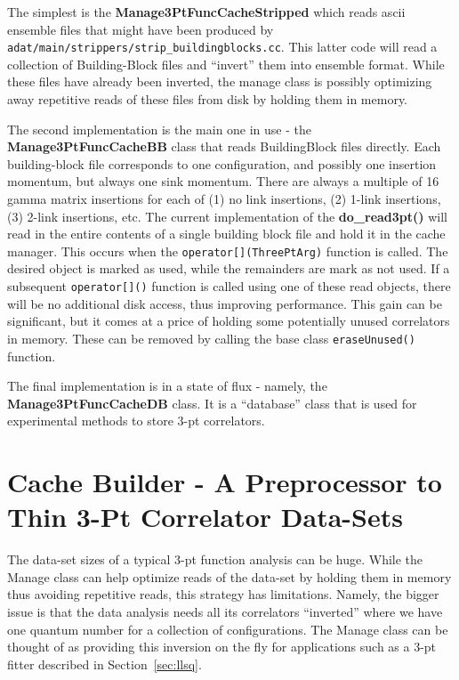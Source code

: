 \documentclass[11pt]{article}
\begin{document}
The simplest is the {\bf Manage3PtFuncCacheStripped}
which reads ascii ensemble files that might have been produced by 
{\tt adat/main/strippers/strip\_buildingblocks.cc}. This latter code
will read a collection of Building-Block files and ``invert'' them into
ensemble format. While these files have already been inverted, the manage
class is possibly optimizing away repetitive reads of these files from
disk by holding them in memory.

The second implementation is the main one in use - the 
{\bf Manage3PtFuncCacheBB} class that reads BuildingBlock files directly.
Each building-block file corresponds to one configuration, and possibly
one insertion momentum, but always one sink momentum. There are always
a multiple of 16 gamma matrix insertions for each of (1) no link insertions,
(2) 1-link insertions, (3) 2-link insertions, etc. The current implementation
of the {\bf do\_read3pt()} will read in the entire contents of a single
building block file and hold it in the cache manager. This occurs when
the {\tt operator[](ThreePtArg)} function is called. The desired
object is marked as used, while the remainders are mark as not used.
If a subsequent {\tt operator[]()} function is called using one of these
read objects, there will be no additional disk access, thus improving
performance. This gain can be significant, but it comes at a price of
holding some potentially unused correlators in memory. These can be
removed by calling the base class {\tt eraseUnused()} function.

The final implementation is in a state of flux - namely, the 
{\bf Manage3PtFuncCacheDB} class. It is a ``database'' class that is used for
experimental methods to store 3-pt correlators.

\section{Cache Builder - A Preprocessor to Thin 3-Pt Correlator Data-Sets}

The data-set sizes of a typical 3-pt function analysis can be
huge. While the Manage class can help optimize reads of the data-set
by holding them in memory thus avoiding repetitive reads, this
strategy has limitations.  Namely, the bigger issue is that the data
analysis needs all its correlators ``inverted'' where we have one
quantum number for a collection of configurations. The Manage class
can be thought of as providing this inversion on the fly for
applications such as a 3-pt fitter described in
Section~\ref{sec:llsq}.  
\end{document}
